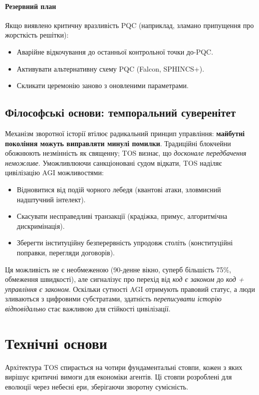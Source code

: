 \documentclass[11pt]{article}
\begin{document}
\paragraph{Резервний план}
Якщо виявлено критичну вразливість PQC (наприклад, зламано припущення про жорсткість решітки):
\begin{itemize}[noitemsep]
  \item Аварійне відкочування до останньої контрольної точки до-PQC.
  \item Активувати альтернативну схему PQC (Falcon, SPHINCS+).
  \item Скликати церемонію заново з оновленими параметрами.
\end{itemize}

\subsection{Філософські основи: темпоральний суверенітет}

Механізм зворотної історії втілює радикальний принцип управління: \textbf{майбутні покоління можуть виправляти минулі помилки}. Традиційні блокчейни обожнюють незмінність як священну; TOS визнає, що \emph{досконале передбачення неможливе}. Уможливлюючи санкціоновані судом відкати, TOS наділяє цивілізацію AGI можливостями:
\begin{itemize}[noitemsep]
  \item Відновитися від подій чорного лебедя (квантові атаки, зловмисний надштучний інтелект).
  \item Скасувати несправедливі транзакції (крадіжка, примус, алгоритмічна дискримінація).
  \item Зберегти інституційну безперервність упродовж століть (конституційні поправки, перегляди договорів).
\end{itemize}

Ця можливість не є необмеженою (90-денне вікно, суперб більшість 75\%, обмеження швидкості), але сигналізує про перехід від \emph{код є законом} до \emph{код + управління є законом}. Оскільки сутності AGI отримують правовий статус, а люди зливаються з цифровими субстратами, здатність \emph{переписувати історію відповідально} стає важливою для стійкості цивілізації.

\section{Технічні основи}

Архітектура TOS спирається на чотири фундаментальні стовпи, кожен з яких вирішує критичні вимоги для економіки агентів. Ці стовпи розроблені для еволюції через небесні ери, зберігаючи зворотну сумісність.
\end{document}
